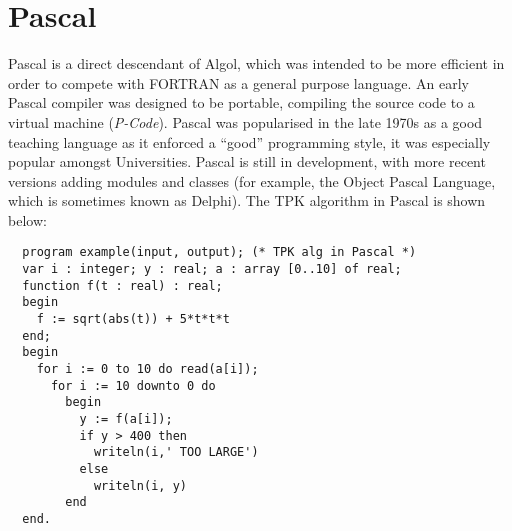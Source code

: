\section{Pascal}
Pascal is a direct descendant of Algol, which was intended to be more efficient in order to compete with FORTRAN as a general purpose language. An early Pascal compiler was designed to be portable, compiling the source code to a virtual machine (\textit{P-Code}). Pascal was popularised in the late 1970s as a good teaching language as it enforced a ``good'' programming style, it was especially popular amongst Universities. Pascal is still in development, with more recent versions adding modules and classes (for example, the Object Pascal Language, which is sometimes known as Delphi). The TPK algorithm in Pascal is shown below:
\begin{verbatim}
  program example(input, output); (* TPK alg in Pascal *)
  var i : integer; y : real; a : array [0..10] of real;
  function f(t : real) : real;
  begin
    f := sqrt(abs(t)) + 5*t*t*t
  end;
  begin
    for i := 0 to 10 do read(a[i]);
      for i := 10 downto 0 do
        begin
          y := f(a[i]);
          if y > 400 then
            writeln(i,' TOO LARGE')
          else
            writeln(i, y)
        end
  end.
\end{verbatim}

